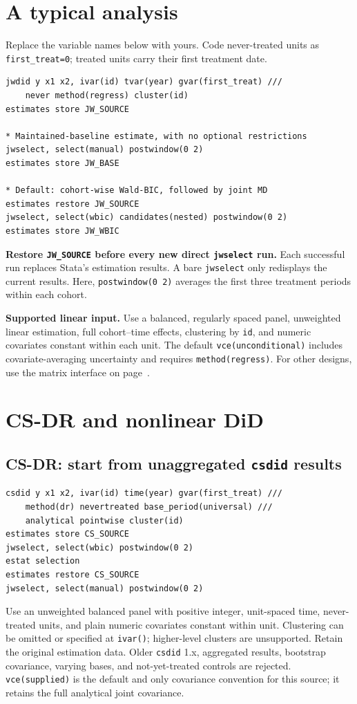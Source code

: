 \documentclass[11pt]{article}
\newcommand{\cmd}[1]{\texttt{#1}}
\begin{document}
\section{A typical analysis}
Replace the variable names below with yours. Code never-treated units as
\cmd{first\_treat=0}; treated units carry their first treatment date.
\begin{lstlisting}
jwdid y x1 x2, ivar(id) tvar(year) gvar(first_treat) ///
    never method(regress) cluster(id)
estimates store JW_SOURCE

* Maintained-baseline estimate, with no optional restrictions
jwselect, select(manual) postwindow(0 2)
estimates store JW_BASE

* Default: cohort-wise Wald-BIC, followed by joint MD
estimates restore JW_SOURCE
jwselect, select(wbic) candidates(nested) postwindow(0 2)
estimates store JW_WBIC
\end{lstlisting}
\textbf{Restore \cmd{JW\_SOURCE} before every new direct \cmd{jwselect} run.}
Each successful run replaces Stata's estimation results. A bare \cmd{jwselect}
only redisplays the current results. Here, \cmd{postwindow(0 2)} averages the
first three treatment periods within each cohort.

\textbf{Supported linear input.} Use a balanced, regularly spaced panel,
unweighted linear estimation, full cohort--time effects, clustering by
\cmd{id}, and numeric covariates constant within each unit. The default
\cmd{vce(unconditional)} includes covariate-averaging uncertainty and requires
\cmd{method(regress)}. For other designs, use the matrix interface on page~\pageref{sec:matrix}.

\section{CS-DR and nonlinear DiD}
\subsection*{CS-DR: start from unaggregated \texttt{csdid} results}
\begin{lstlisting}
csdid y x1 x2, ivar(id) time(year) gvar(first_treat) ///
    method(dr) nevertreated base_period(universal) ///
    analytical pointwise cluster(id)
estimates store CS_SOURCE
jwselect, select(wbic) postwindow(0 2)
estat selection
estimates restore CS_SOURCE
jwselect, select(manual) postwindow(0 2)
\end{lstlisting}
Use an unweighted balanced panel with positive integer, unit-spaced time,
never-treated units, and plain numeric covariates constant within unit.
Clustering can be omitted or specified at \cmd{ivar()}; higher-level clusters
are unsupported. Retain the original estimation data. Older \cmd{csdid} 1.x,
aggregated results, bootstrap covariance, varying bases, and not-yet-treated
controls are rejected. \cmd{vce(supplied)} is the default and only covariance
convention for this source; it retains the full analytical joint covariance.
\end{document}
